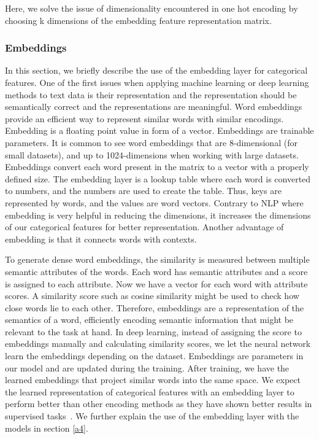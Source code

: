 \documentclass{article}
\begin{document}
Here, we solve the issue of dimensionality encountered in one hot encoding by choosing k dimensions of the embedding feature representation matrix. 

\subsubsection{Embeddings}

In this section, we briefly describe the use of the embedding layer for categorical features. One of the first issues when applying machine learning or deep learning methods to text data is their representation and the representation should be semantically correct and the representations are meaningful. Word embeddings provide an efficient way to represent similar words with similar encodings. Embedding is a floating point value in form of a vector. Embeddings are trainable parameters. It is common to see word embeddings that are 8-dimensional (for small datasets), and up to 1024-dimensions when working with large datasets. Embeddings convert each word present in the matrix to a vector with a properly defined size. The embedding layer is a lookup table where each word is converted to numbers, and the numbers are used to create the table. Thus, keys are represented by words, and the values are word vectors. Contrary to NLP where embedding is very helpful in reducing the dimensions, it increases the dimensions of our categorical features for better representation. Another advantage of embedding is that it connects words with contexts. 

To generate dense word embeddings, the similarity is measured between multiple semantic attributes of the words. Each word has semantic attributes and a score is assigned to each attribute. Now we have a vector for each word with attribute scores. A similarity score such as cosine similarity might be used to check how close words lie to each other. Therefore, embeddings are a representation of the semantics of a word, efficiently encoding semantic information that might be relevant to the task at hand. In deep learning, instead of assigning the score to embeddings manually and calculating similarity scores, we let the neural network learn the embeddings depending on the dataset. Embeddings are parameters in our model and are updated during the training. After training, we have the learned embeddings that project similar words into the same space. We expect the learned representation of categorical features with an embedding layer to perform better than other encoding methods as they have shown better results in supervised tasks~\citep{entity1}. We further explain the use of the embedding layer with the models in section \ref{a4}.
\end{document}
